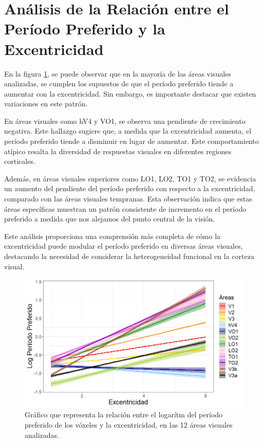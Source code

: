 \section{Análisis de la Relación entre el Período Preferido y la Excentricidad}

En la figura \ref{fig:pp_vs_eccen}, se puede observar que en la mayoría de las áreas visuales analizadas, se cumplen los supuestos de que el período preferido tiende a aumentar con la excentricidad. Sin embargo, es importante destacar que existen variaciones en este patrón.

En áreas visuales como hV4 y VO1, se observa una pendiente de crecimiento negativa. Este hallazgo sugiere que, a medida que la excentricidad aumenta, el período preferido tiende a disminuir en lugar de aumentar. Este comportamiento atípico resalta la diversidad de respuestas visuales en diferentes regiones corticales.

Además, en áreas visuales superiores como LO1, LO2, TO1 y TO2,  se evidencia un aumento del pendiente del período preferido con respecto a la excentricidad, comparado con las áreas visuales tempranas. Esta observación indica que estas áreas específicas muestran un patrón consistente de incremento en el período preferido a medida que nos alejamos del punto central de la visión.

Este análisis proporciona una comprensión más completa de cómo la excentricidad puede modular el período preferido en diversas áreas visuales, destacando la necesidad de considerar la heterogeneidad funcional en la corteza visual.

\begin{figure}
	\centering
	\includegraphics[scale=0.6]{Graphics/pp_vs_eccen}
	\caption{Gráfico que representa la relación entre el logar\'itm del per\'iodo preferido de los v\'oxeles y la excentricidad, en las 12 áreas visuales analizadas.}
	\label{fig:pp_vs_eccen}
\end{figure}

